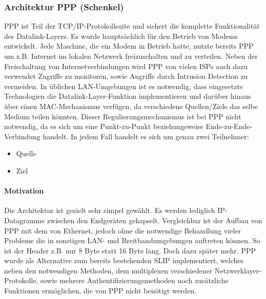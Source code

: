 \subsubsection{Architektur PPP (Schenkel)}
\label{subsubsection:architecture_ppp}
\ac{PPP} ist Teil der TCP/IP-Protokollsuite und sichert die komplette Funktionalität des
Datalink-Layers. Es wurde hauptsächlich für den Betrieb von Modems entwickelt. %
Jede Maschine, die ein Modem in Betrieb hatte, nutzte bereits \ac{PPP} um z.B.
Internet im lokalen Netzwerk freizuschalten und zu verteilen.
Neben der Freischaltung von Internetverbindungen wird \ac{PPP} von vielen \acp{ISP}
auch dazu verwendet Zugriffe zu monitoren, sowie Angriffe durch Intrusion Detection zu vermeiden.
In üblichen \ac{LAN}-Umgebungen ist es notwendig, dass eingesetzte Technologien die Datalink-Layer-Funktion
implementieren und darüber hinaus über einen MAC-Mechanismus verfügen, da verschiedene
Quellen/Ziele das selbe Medium teilen könnten. Dieser Regulierungsmechanismus ist bei \ac{PPP}
nicht notwendig, da es sich um eine Punkt-zu-Punkt beziehungsweise Ende-zu-Ende-Verbindung handelt.
In jedem Fall handelt es sich um genau zwei Teilnehmer:
\begin{itemize}
	\item Quelle
	\item Ziel
\end{itemize}


\paragraph{Motivation} Die Architektur ist gezielt sehr simpel gewählt. Es werden lediglich IP-Datagramme zwischen den
Endgeräten gekapselt. Vergleichbar ist der Aufbau von PPP mit dem von Ethernet, jedoch ohne
die notwendige Behandlung vieler Probleme die in sonstigen \ac{LAN}- und Breitbandumgebungen
auftreten können. So ist der Header z.B. nur 8 Byte statt 16 Byte lang. Doch dazu später mehr.
\ac{PPP} wurde als Alternative zum bereits bestehenden \ac{SLIP} implementiert, welches neben den notwendigen
Methoden, dem multiplexen verschiedener Netzwerklayer-Protokolle, sowie mehrere Authentifizierungsmethoden noch zusätzliche Funktionen ermöglichen, die von PPP nicht benötigt werden.

